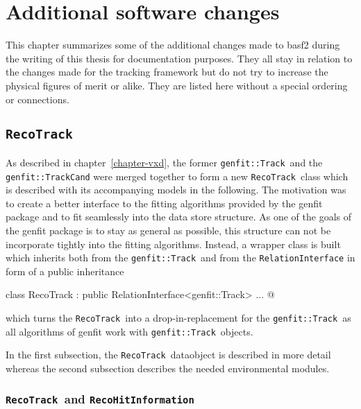 \newcommand{\RecoTrack}{\texttt{RecoTrack}\ }
\newcommand{\Track}{\texttt{genfit::Track}\ }
\newcommand{\Hit}{\texttt{RecoHitInformation}\ }
\chapter{Additional software changes} \label{chapter-addon}

This chapter summarizes some of the additional changes made to basf2 during the writing of this thesis for documentation purposes. They all stay in relation to the changes made for the tracking framework but do not try to increase the physical figures of merit or alike. They are listed here without a special ordering or connections.

\section{\texttt{RecoTrack}}
As described in chapter~\ref{chapter-vxd}, the former \Track and the \texttt{genfit::TrackCand} were merged together to form a new \RecoTrack class which is described with its accompanying models in the following. The motivation was to create a better interface to the fitting algorithms provided by the genfit package and to fit seamlessly into the data store structure. As one of the goals of the genfit package is to stay as general as possible, this structure can not be incorporate tightly into the fitting algorithms. Instead, a wrapper class is built which inherits both from the \Track and from the \texttt{RelationInterface} in form of a public inheritance 
\begin{center}
  \lstset{escapechar=@,style=customC}
  \lstinline@ class RecoTrack : public RelationInterface<genfit::Track> { ... }@
\end{center}
which turns the \RecoTrack into a drop-in-replacement for the \Track as all algorithms of genfit work with \Track objects. 

In the first subsection, the \RecoTrack dataobject is described in more detail whereas the second subsection describes the needed environmental modules.

\subsection{\RecoTrack and \Hit}

